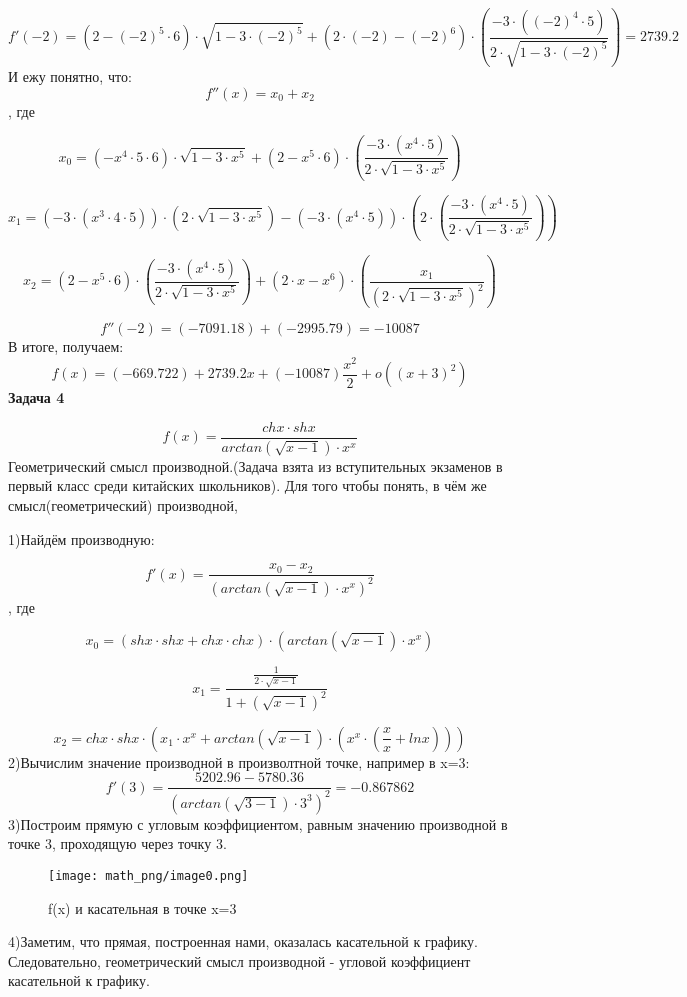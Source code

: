 \documentclass[12pt,a4paper,fleqn]{article}
\begin{document}
$$
f'(-2)=\left(2-(-2)^{5}\cdot6\right)\cdot\sqrt{1-3\cdot(-2)^{5}}+\left(2\cdot(-2)-(-2)^{6}\right)\cdot\left(\frac{-3\cdot\left((-2)^{4}\cdot5\right)}{2\cdot\sqrt{1-3\cdot(-2)^{5}}}\right)=2739.2
$$
И ежу понятно, что:
$$
f''(x)= x_{0}+ x_{2}
$$
, где

$$
x_{0} = \left(- x^{4}\cdot5\cdot6\right)\cdot\sqrt{1-3\cdot x^{5}}+\left(2- x^{5}\cdot6\right)\cdot\left(\frac{-3\cdot\left( x^{4}\cdot5\right)}{2\cdot\sqrt{1-3\cdot x^{5}}}\right)
$$

$$
x_{1} = \left(-3\cdot\left( x^{3}\cdot4\cdot5\right)\right)\cdot\left(2\cdot\sqrt{1-3\cdot x^{5}}\right)-\left(-3\cdot\left( x^{4}\cdot5\right)\right)\cdot\left(2\cdot\left(\frac{-3\cdot\left( x^{4}\cdot5\right)}{2\cdot\sqrt{1-3\cdot x^{5}}}\right)\right)
$$

$$
x_{2} = \left(2- x^{5}\cdot6\right)\cdot\left(\frac{-3\cdot\left( x^{4}\cdot5\right)}{2\cdot\sqrt{1-3\cdot x^{5}}}\right)+\left(2\cdot x- x^{6}\right)\cdot\left(\frac{ x_{1}}{\left(2\cdot\sqrt{1-3\cdot x^{5}}\right)^{2}}\right)
$$

$$
f''(-2)=(-7091.18)+(-2995.79)=-10087
$$
В итоге, получаем:
$$
f(x)=(-669.722)+2739.2x+(-10087)\frac{x^2}{2}+o((x+3)^{2})
$$
{\bf \Large
Задача 4
}

$$
f(x)=\frac{ ch x\cdot sh x}{ arctan\left(\sqrt{ x-1}\right)\cdot x^{ x}}
$$
Геометрический смысл производной.(Задача взята из вступительных экзаменов в первый класс среди китайских школьников). Для того чтобы понять, в чём же смысл(геометрический) производной,

1)Найдём производную:

$$
f'(x)=\frac{ x_{0}- x_{2}}{\left( arctan\left(\sqrt{ x-1}\right)\cdot x^{ x}\right)^{2}}
$$
, где

$$
x_{0} = \left( sh x\cdot sh x+ ch x\cdot ch x\right)\cdot\left( arctan\left(\sqrt{ x-1}\right)\cdot x^{ x}\right)
$$

$$
x_{1} = \frac{\frac{1}{2\cdot\sqrt{ x-1}}}{1+\left(\sqrt{ x-1}\right)^{2}}
$$

$$
x_{2} =  ch x\cdot sh x\cdot\left( x_{1}\cdot x^{ x}+ arctan\left(\sqrt{ x-1}\right)\cdot\left( x^{ x}\cdot\left(\frac{ x}{ x}+ ln x\right)\right)\right)
$$
2)Вычислим значение производной в произволтной точке, например в x=3:
$$
f'(3)=\frac{5202.96-5780.36}{\left( arctan\left(\sqrt{3-1}\right)\cdot3^{3}\right)^{2}}=-0.867862
$$
3)Построим прямую с угловым коэффициентом, равным значению производной в точке 3, проходящую через точку 3.

\begin{figure}[h]
\texttt{[image: math\_png/image0.png]}
\caption{f(x) и касательная в точке x=3}
\end{figure}4)Заметим, что прямая, построенная нами, оказалась касательной к графику. Следовательно, геометрический смысл производной - угловой коэффициент касательной к графику.
\end{document}
